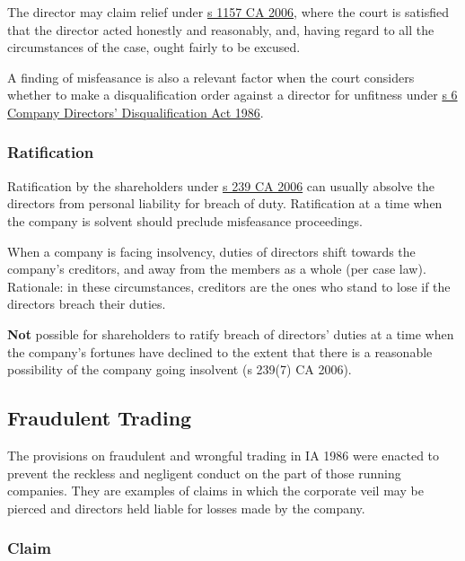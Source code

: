 \documentclass[
]{article}
\begin{document}
The director may claim relief under
\href{https://www.legislation.gov.uk/ukpga/2006/46/section/1157}{s 1157
CA 2006}, where the court is satisfied that the director acted honestly
and reasonably, and, having regard to all the circumstances of the case,
ought fairly to be excused.

A finding of misfeasance is also a relevant factor when the court
considers whether to make a disqualification order against a director
for unfitness under
\href{https://www.legislation.gov.uk/ukpga/1986/46/section/6}{s 6
Company Directors' Disqualification Act 1986}.

\hypertarget{ratification}{%
\subsubsection{Ratification}\label{ratification}}

Ratification by the shareholders under
\href{https://www.legislation.gov.uk/ukpga/2006/46/section/239}{s 239 CA
2006} can usually absolve the directors from personal liability for
breach of duty. Ratification at a time when the company is solvent
should preclude misfeasance proceedings.

When a company is facing insolvency, duties of directors shift towards
the company's creditors, and away from the members as a whole (per case
law). Rationale: in these circumstances, creditors are the ones who
stand to lose if the directors breach their duties.

\textbf{Not} possible for shareholders to ratify breach of directors'
duties at a time when the company's fortunes have declined to the extent
that there is a reasonable possibility of the company going insolvent (s
239(7) CA 2006).

\hypertarget{fraudulent-trading}{%
\subsection{Fraudulent Trading}\label{fraudulent-trading}}

The provisions on fraudulent and wrongful trading in IA 1986 were
enacted to prevent the reckless and negligent conduct on the part of
those running companies. They are examples of claims in which the
corporate veil may be pierced and directors held liable for losses made
by the company.

\hypertarget{claim}{%
\subsubsection{Claim}\label{claim}}
\end{document}
